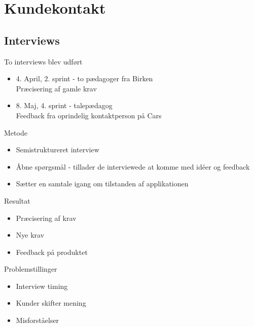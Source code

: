 \section{Kundekontakt}

\subsection{Interviews}

\begin{frame}
To interviews blev udført 

\begin{itemize}
\item 4. April, 2. sprint - to pædagoger fra Birken \\ Præcisering af gamle krav
\item 8. Maj, 4. sprint - talepædagog \\Feedback fra oprindelig kontaktperson på Cars 
\end{itemize}

\end{frame}

\begin{frame}{Metode}
\begin{itemize}
\item Semistruktureret interview 
\item Åbne spørgsmål - tillader de interviewede at komme med idéer og feedback
\item Sætter en samtale igang om tilstanden af applikationen
\end{itemize}
\end{frame}

\begin{frame}{Resultat}
\begin{itemize}
\item Præcisering af krav
\item Nye krav
\item Feedback på produktet
\end{itemize}
\end{frame}

\begin{frame}{Problemstillinger}
\begin{itemize}
\item Interview timing
\item Kunder skifter mening
\item Misforståelser
\end{itemize}
\end{frame}

